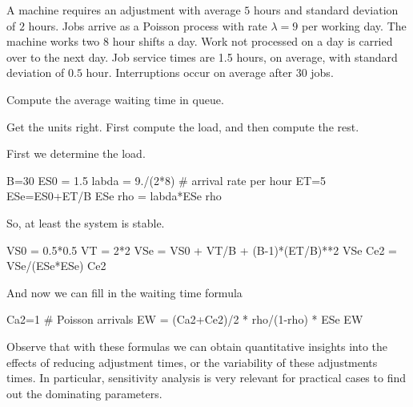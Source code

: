 \begin{exercise}
A machine requires an adjustment with average $5$ hours and standard deviation of $2$ hours. Jobs arrive as a Poisson process with rate $\lambda=9$ per working day. The machine works two $8$ hour shifts a day. Work not processed on a day is carried over to the next day. Job service times are 1.5 hours, on average, with standard deviation of $0.5$ hour. Interruptions occur on average after $30$ jobs.

Compute the average waiting time in queue.
\begin{hint}
  Get the units right. First compute the load, and then compute the rest.
\end{hint}
\begin{solution}
  First we determine the load. 
  \begin{pyconsole}
B=30
ES0 = 1.5
labda = 9./(2*8) # arrival rate per hour
ET=5
ESe=ES0+ET/B
ESe
rho = labda*ESe
rho
  \end{pyconsole}
So, at least the system is stable.

\begin{pyconsole}
VS0 = 0.5*0.5
VT = 2*2
VSe = VS0 + VT/B + (B-1)*(ET/B)**2
VSe
Ce2 = VSe/(ESe*ESe)
Ce2
\end{pyconsole}

And now we can fill in the waiting time formula
\begin{pyconsole}
Ca2=1 # Poisson arrivals
EW = (Ca2+Ce2)/2 * rho/(1-rho) * ESe
EW  
\end{pyconsole}
\end{solution}
\end{exercise}

Observe that with these formulas we can obtain quantitative insights into the effects of reducing adjustment times, or the variability of these adjustments times. In particular, sensitivity analysis is very relevant for practical cases to find out the dominating parameters. 








